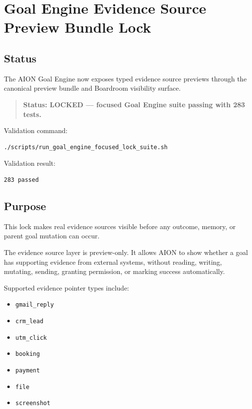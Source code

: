 \section{Goal Engine Evidence Source Preview Bundle Lock}
\label{sec:aion-goal-engine-evidence-source-preview-bundle-lock}

\subsection{Status}

The AION Goal Engine now exposes typed evidence source previews through the canonical preview bundle and Boardroom visibility surface.

\begin{quote}
\textbf{Status: LOCKED --- focused Goal Engine suite passing with 283 tests.}
\end{quote}

Validation command:

\begin{verbatim}
./scripts/run_goal_engine_focused_lock_suite.sh
\end{verbatim}

Validation result:

\begin{verbatim}
283 passed
\end{verbatim}

\subsection{Purpose}

This lock makes real evidence sources visible before any outcome, memory, or parent goal mutation can occur.

The evidence source layer is preview-only. It allows AION to show whether a goal has supporting evidence from external systems, without reading, writing, mutating, sending, granting permission, or marking success automatically.

Supported evidence pointer types include:

\begin{itemize}
  \item \texttt{gmail\_reply}
  \item \texttt{crm\_lead}
  \item \texttt{utm\_click}
  \item \texttt{booking}
  \item \texttt{payment}
  \item \texttt{file}
  \item \texttt{screenshot}
\end{itemize}

